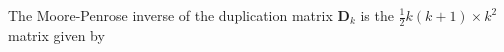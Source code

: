The Moore-Penrose inverse of the duplication matrix 
$
\mathbf{D}_{k}
$
is the 
$
\frac{1}{2}
k 
\left( 
k
+
1 
\right)
\times 
k^2
$  
matrix given by
